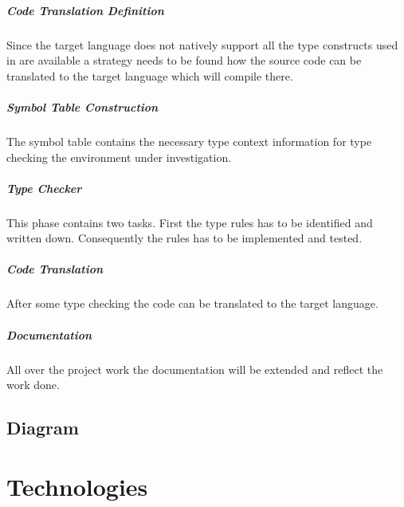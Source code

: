 \paragraph{Code Translation Definition}
Since the target language does not natively support all the type constructs used in \ooplss are available a strategy needs to be found how the source code can be translated to the target language which will compile there.

\paragraph{Symbol Table Construction}
The symbol table contains the necessary type context information for type checking the environment under investigation.

\paragraph{Type Checker}
This phase contains two tasks. First the type rules has to be identified and written down. Consequently the rules has to be implemented and tested.

\paragraph{Code Translation}
After some type checking the code can be translated to the target language.

\paragraph{Documentation}
All over the project work the documentation will be extended and reflect the work done.

\section{Diagram}
\begin{sideways}
	\centering
	
\end{sideways}

\chapter{Technologies}

